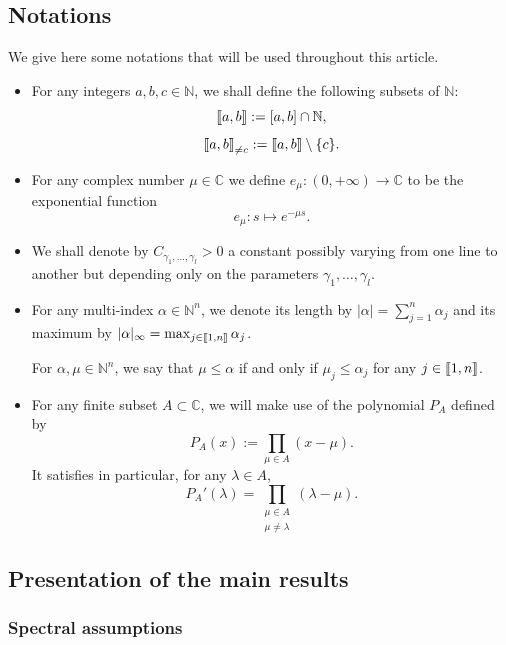 \documentclass[11pt]{article}
\theoremstyle{definition}
\numberwithin{equation}{section}
\numberwithin{figure}{section}
\numberwithin{table}{section}
\newcommand{\llbracket}{\mathopen{[\mkern -2.7mu[}}
\newcommand{\rrbracket}{\mathclose{]\mkern -2.7mu]}}
\newcommand{\inter}[2]{\llbracket #1,#2 \rrbracket}
\newcommand{\interexclu}[3]{\llbracket #1,#2\rrbracket_{\neq #3}}
\newcommand{\N}{\mathbb{N}}
\newcommand{\C}{\mathbb{C}}
\begin{document}
\subsection{Notations}
We give here some notations that will be used throughout this article.
\begin{itemize}
\item For any integers $a,b,c\in \N$, we shall define the following subsets of $\N$:
\[
\inter{a}{b} := [a,b]\cap \N,
\]
\[
\interexclu{a}{b}{c} := \inter{a}{b}\setminus \{c\}.
\]
\item For any complex number $\mu\in \C$ we define $e_\mu:(0,+\infty)\to \C$ to be the exponential function
\begin{equation}\label{def_emu}
e_\mu:s\mapsto e^{-\mu s}.
\end{equation}
\item We shall denote by $C_{\gamma_1,\dotsc,\gamma_l}>0$ a constant possibly varying from one line to another but depending only on the parameters $\gamma_1,\dotsc,\gamma_l$.
\item For any multi-index $\alpha\in \N^n$, we denote its length by $|\alpha| = \sum_{j=1}^n \alpha_j$ and its maximum by $|\alpha|_\infty=\max_{j\in \inter{1}{n}} \alpha_j$.

For $\alpha,\mu\in \N^n$, we say that $\mu\leq \alpha$ if and only if $\mu_j\leq \alpha_j$ for any $j\in \inter{1}{n}$.
\item For any finite subset $A\subset \C$, we will make use of the polynomial $P_A$ defined by
\begin{equation}\label{Def:P}
P_A(x):=\prod_{\mu\in A} (x-\mu).
\end{equation}
It satisfies in particular, for any $\lambda\in A$,
\begin{equation*}\label{Def:P'}
P_A'(\lambda) = \prod_{ \substack{ \mu \in A \\ \mu \neq \lambda}} (\lambda - \mu).
\end{equation*}
\end{itemize}


\subsection{Presentation of the main results}

\subsubsection{Spectral assumptions} \label{Subsec:SpectralAssumptions}
\end{document}
